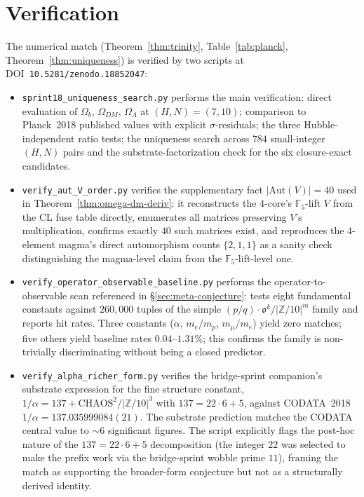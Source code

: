 \documentclass[11pt,reqno]{amsart}
\theoremstyle{plain}
\theoremstyle{definition}
\theoremstyle{remark}
\newcommand{\Z}{\mathbb{Z}}
\newcommand{\F}{\mathbb{F}}
\newcommand{\Aut}{\mathrm{Aut}}
\begin{document}
\section{Verification}\label{sec:verify}

The numerical match (Theorem~\ref{thm:trinity}, Table~\ref{tab:planck},
Theorem~\ref{thm:uniqueness}) is verified by two scripts at
DOI~\texttt{10.5281/zenodo.18852047}:

\begin{itemize}\setlength\itemsep{0pt}
\item \texttt{sprint18\_uniqueness\_search.py} performs the main
verification: direct evaluation of $\Omega_b$, $\Omega_{DM}$,
$\Omega_\Lambda$ at $(H, N) = (7, 10)$; comparison to Planck~2018
published values with explicit $\sigma$-residuals; the three
Hubble-independent ratio tests; the uniqueness search across $784$
small-integer $(H, N)$ pairs and the substrate-factorization check
for the six closure-exact candidates.

\item \texttt{verify\_aut\_V\_order.py} verifies the supplementary
fact $|\Aut(V)| = 40$ used in
Theorem~\ref{thm:omega-dm-deriv}: it reconstructs the $4$-core's
$\F_5$-lift $V$ from the CL fuse table directly, enumerates
all matrices preserving $V$'s multiplication, confirms exactly
$40$ such matrices exist, and reproduces the $4$-element magma's
direct automorphism counts $\{2, 1, 1\}$ as a sanity check
distinguishing the magma-level claim from the $\F_5$-lift-level
one.

\item \texttt{verify\_operator\_observable\_baseline.py}
performs the operator-to-observable scan referenced in
\S\ref{sec:meta-conjecture}: tests eight fundamental constants
against $260{,}000$ tuples of the simple
$(p/q) \cdot \mathfrak{o}^{k}/|\Z/10|^{m}$ family and reports
hit rates. Three constants ($\alpha$, $m_e/m_p$, $m_\mu/m_e$)
yield zero matches; five others yield baseline rates
$0.04$--$1.31\%$; this confirms the family is non-trivially
discriminating without being a closed predictor.

\item \texttt{verify\_alpha\_richer\_form.py}
verifies the bridge-sprint companion's substrate expression for
the fine structure constant,
$1/\alpha = 137 + \mathrm{CHAOS}^{2}/|\Z/10|^{3}$ with
$137 = 22 \cdot 6 + 5$, against CODATA~2018
$1/\alpha = 137.035999084(21)$. The substrate prediction matches
the CODATA central value to $\sim 6$ significant figures. The
script explicitly flags the post-hoc nature of the
$137 = 22 \cdot 6 + 5$ decomposition (the integer $22$ was
selected to make the prefix work via the bridge-sprint wobble
prime $11$), framing the match as supporting the broader-form
conjecture but not as a structurally derived identity.
\end{itemize}
\end{document}
